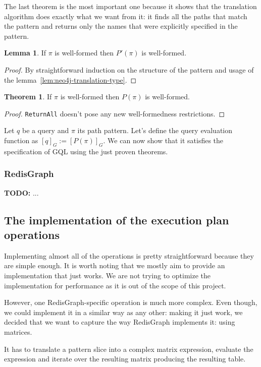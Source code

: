 \documentclass[14pt]{constructor-thesis}
\theoremstyle{definition}
\newtheorem{theorem}{Theorem}
\newtheorem{lemma}{Lemma}
\newcommand{\todo}[1]{
  \begin{tcolorbox}[colframe=red!75!black,colback=red!5!white,arc=0pt,fonttitle=\bfseries]
  \textbf{TODO:} #1
  \end{tcolorbox}
}
\begin{document}
The last theorem is the most important one because it shows that the translation algorithm does exactly what we want from it: it finds all the paths that match the pattern and returns only the names that were explicitly specified in the pattern.

\begin{lemma}
  If $\pi$ is well-formed then $P'(\pi)$ is well-formed.
\end{lemma}
\begin{proof}
  By straightforward induction on the structure of the pattern and usage of the lemma~\ref{lem:neo4j-translation-type}.
\end{proof}

\begin{theorem}
  If $\pi$ is well-formed then $P(\pi)$ is well-formed.
\end{theorem}
\begin{proof}
  \texttt{ReturnAll} doesn't pose any new well-formedness restrictions.
\end{proof}

Let $q$ be a query and $\pi$ its path pattern. Let's define the query evaluation function as $[q]_G := [P(\pi)]_G$. We can now show that it satisfies the specification of GQL using the just proven theorems.

\subsubsection{RedisGraph}

\todo{...}

\subsection{The implementation of the execution plan operations}

Implementing almost all of the operations is pretty straightforward because they are simple enough. It is worth noting that we mostly aim to provide an implementation that just works. We are not trying to optimize the implementation for performance as it is out of the scope of this project.

However, one RedisGraph-specific operation is much more complex. Even though, we could implement it in a similar way as any other: making it just work, we decided that we want to capture the way RedisGraph implements it: using matrices. 

It has to translate a pattern slice into a complex matrix expression, evaluate the expression and iterate over the resulting matrix producing the resulting table. 
\end{document}
